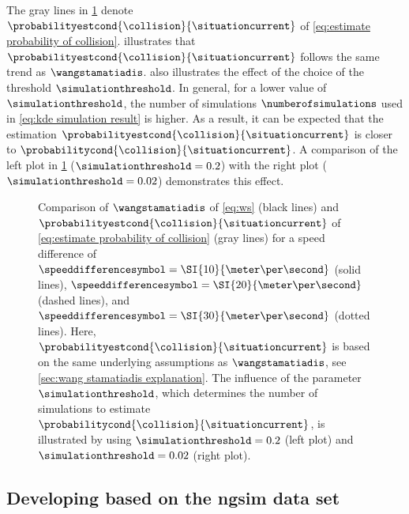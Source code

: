 The gray lines in \cref{fig:ws comparison} denote $\probabilityestcond{\collision}{\situationcurrent}$ of \cref{eq:estimate probability of collision}.
 illustrates that $\probabilityestcond{\collision}{\situationcurrent}$ follows the same trend as $\wangstamatiadis$.
 also illustrates the effect of the choice of the threshold $\simulationthreshold$.
In general, for a lower value of $\simulationthreshold$, the number of simulations $\numberofsimulations$ used in \cref{eq:kde simulation result} is higher. 
As a result, it can be expected that the estimation $\probabilityestcond{\collision}{\situationcurrent}$ is closer to $\probabilitycond{\collision}{\situationcurrent}$.
A comparison of the left plot in \cref{fig:ws comparison} ($\simulationthreshold=0.2$) with the right plot ($\simulationthreshold=0.02$) demonstrates this effect.

\setlength{\figurewidth}{.47\linewidth}
\setlength{\figureheight}{.7\figurewidth}
\begin{figure}
	\centering
	
	
	\caption{Comparison of $\wangstamatiadis$ of \cref{eq:ws} (black lines) and $\probabilityestcond{\collision}{\situationcurrent}$ of \cref{eq:estimate probability of collision} (gray lines) for a speed difference of $\speeddifferencesymbol=\SI{10}{\meter\per\second}$ (solid lines), $\speeddifferencesymbol=\SI{20}{\meter\per\second}$ (dashed lines), and $\speeddifferencesymbol=\SI{30}{\meter\per\second}$ (dotted lines).
		Here, $\probabilityestcond{\collision}{\situationcurrent}$ is based on the same underlying assumptions as $\wangstamatiadis$, see \cref{sec:wang stamatiadis explanation}.
		The influence of the parameter $\simulationthreshold$, which determines the number of simulations to estimate $\probabilitycond{\collision}{\situationcurrent}$, is illustrated by using $\simulationthreshold=0.2$ (left plot) and $\simulationthreshold=0.02$ (right plot).}
	\label{fig:ws comparison}
\end{figure}



\subsection{Developing  based on the \acs{ngsim} data set}
\label{sec:ngsim metric}


